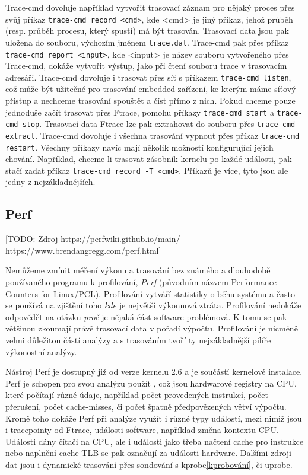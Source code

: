 Trace-cmd dovoluje například vytvořit trasovací záznam pro nějaký proces přes svůj příkaz \texttt{trace-cmd~record~<cmd>}, kde <cmd> je jiný příkaz, jehož průběh (resp. průběh procesu, který spustí) má být trasován. Trasovací data jsou pak uložena do souboru, výchozím jménem \texttt{trace.dat}. Trace-cmd pak přes příkaz \texttt{trace-cmd report <input>}, kde <input> je název souboru vytvořeného přes Trace-cmd, dokáže vytvořit výstup, jako při čtení souboru trace v trasovacím adresáři. Trace-cmd dovoluje i trasovat přes síť s příkazem \texttt{trace-cmd listen}, což může být užitečné pro trasování embedded zařízení, ke kterým máme síťový přístup a nechceme trasování spouštět a číst přímo z nich. Pokud chceme pouze jednoduše začít trasovat přes Ftrace, pomohu příkazy \texttt{trace-cmd start} a \texttt{trace-cmd stop}. Trasovací data Ftrace lze pak extrahovat do souboru přes \texttt{trace-cmd extract}. Trace-cmd dovoluje i všechna trasování vypnout přes příkaz \texttt{trace-cmd restart}. Všechny příkazy navíc mají několik možností konfigurující jejich chování. Například, chceme-li trasovat zásobník kernelu po každé události, pak stačí zadat příkaz \texttt{trace-cmd record -T <cmd>}. Příkazů je více, tyto jsou ale jedny z nejzákladnějších.

\subsection{Perf}
\label{Perf}

[TODO: Zdroj https://perfwiki.github.io/main/ + https://www.brendangregg.com/perf.html]

Nemůžeme zmínit měření výkonu a trasování bez známého a dlouhodobě používaného programu k profilování, \emph{Perf} (původním názvem Performance Counters for Linux/PCL). Profilování vytváří statistiky o běhu systému a často se používá na zjištění toho \emph{kde} je největší výkonnová ztráta. Profilování nedokáže odpovědět na otázku \emph{proč} je nějaká část software problémová. K tomu se pak většinou zkoumají právě trasovací data v pořadí výpočtu. Profilování je nicméně velmi důležitou částí analýzy a s trasováním tvoří ty nejzákladnější pilíře výkonostní analýzy.

Nástroj Perf je dostupný již od verze kernelu 2.6 a je součástí kernelové instalace. Perf je schopen pro svou analýzu použít , což jsou hardwarové registry na CPU, které počítají různé údaje, například počet provedených instrukcí, počet přerušení, počet cache-misses, či počet špatně předpovězených větví výpočtu. Kromě toho dokáže Perf při analýze využít i různé typy událostí, mezi nimiž jsou i tracepointy od Ftrace, události software, například změna kontextu CPU. Události dány čítači na CPU, ale i události jako třeba načtení cache pro instrukce nebo naplnění cache TLB se pak označují za události hardware. Dalšími zdroji dat jsou i dynamické trasování přes sondování s kprobe\ref{kprobování}, či uprobe.

